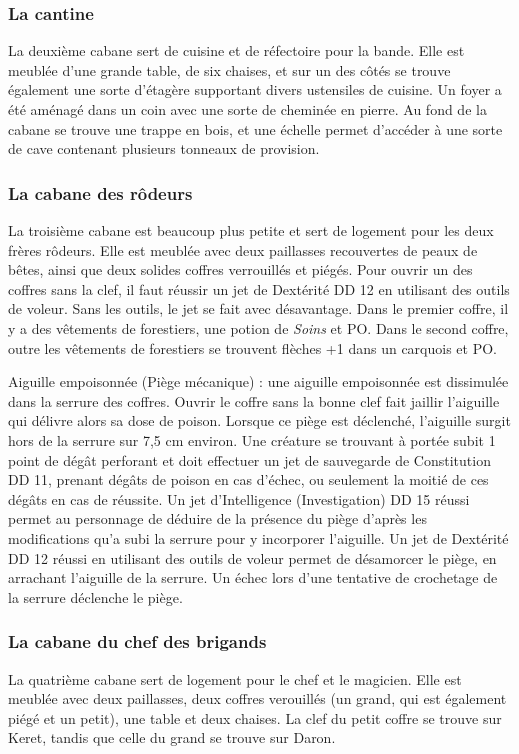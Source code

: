 \documentclass[a4paper,10pt,openany]{book}
\begin{document}
\begin{multicols}{2}
\subsubsection{La cantine} 
La deuxième cabane sert de cuisine et de réfectoire pour la bande. Elle est meublée d’une grande table, de six chaises, et sur un des côtés se trouve
également une sorte d’étagère supportant divers ustensiles de cuisine. Un foyer a été aménagé dans un coin avec une sorte de cheminée en pierre. Au
fond de la cabane se trouve une trappe en bois, et une échelle permet d’accéder à une sorte de cave contenant plusieurs tonneaux de provision.
\subsubsection{La cabane des rôdeurs}
La troisième cabane est beaucoup plus petite et sert de logement pour les deux frères rôdeurs. Elle est meublée avec deux paillasses recouvertes de
peaux de bêtes, ainsi que deux solides coffres verrouillés et piégés. Pour ouvrir un des coffres sans la clef, il faut réussir un jet de Dextérité DD
12 en utilisant des outils de voleur. Sans les outils, le jet se fait avec désavantage. Dans le premier coffre, il y a des vêtements de forestiers,
une potion de \emph{Soins} et  PO. Dans le second coffre, outre les vêtements de forestiers se trouvent  flèches +1 dans un
carquois et  PO.

\begin{quotebox}
	Aiguille empoisonnée (Piège mécanique) : une aiguille empoisonnée est dissimulée dans la serrure des coffres. Ouvrir le coffre sans la bonne clef
	fait jaillir l’aiguille qui délivre alors sa dose de poison. Lorsque ce piège est déclenché, l’aiguille surgit hors de la serrure sur 7,5 cm environ. Une
	créature se trouvant à portée subit 1 point de dégât perforant et doit effectuer un jet de sauvegarde de Constitution DD 11, prenant 
	dégâts de poison en cas d’échec, ou seulement la moitié de ces dégâts en cas de réussite. Un jet d’Intelligence (Investigation) DD 15 réussi permet
	au personnage de déduire de la présence du piège d’après les modifications qu’a subi la serrure pour y incorporer l’aiguille. Un jet de Dextérité DD
	12 réussi en utilisant des outils de voleur permet de désamorcer le piège, en arrachant l’aiguille de la serrure. Un échec lors d’une tentative de
	crochetage de la serrure déclenche le piège.
\end{quotebox}

\subsubsection{La cabane du chef des brigands}
La quatrième cabane sert de logement pour le chef et le magicien. Elle est meublée avec deux paillasses, deux coffres verouillés (un grand, qui est
également piégé et un petit), une table et deux chaises. La clef du petit coffre se trouve sur Keret, tandis que celle du grand se trouve sur Daron.

\end{multicols}
\end{document}
